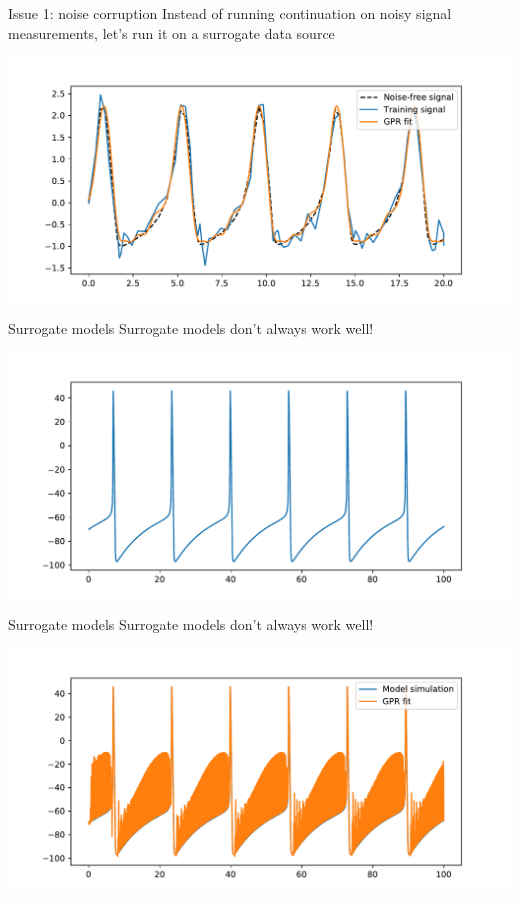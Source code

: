 \documentclass[presentation]{beamer}
\begin{document}
\begin{frame}[label={sec:org90d13d2}]{Issue 1: noise corruption}
Instead of running continuation on noisy signal measurements, let's run it on a surrogate data source

\begin{center}
\includegraphics[width=.9\textwidth]{./GPR_demo.pdf}
\end{center}
\end{frame}

\begin{frame}[label={sec:orgf7e66b6}]{Surrogate models}
Surrogate models don't always work well!

\begin{center}
\includegraphics[width=.9\textwidth]{./HHraw.pdf}
\end{center}
\end{frame}

\begin{frame}[label={sec:orgd250d0d}]{Surrogate models}
Surrogate models don't always work well!

\begin{center}
\includegraphics[width=.9\textwidth]{./HH.pdf}
\end{center}
\end{frame}
\end{document}
